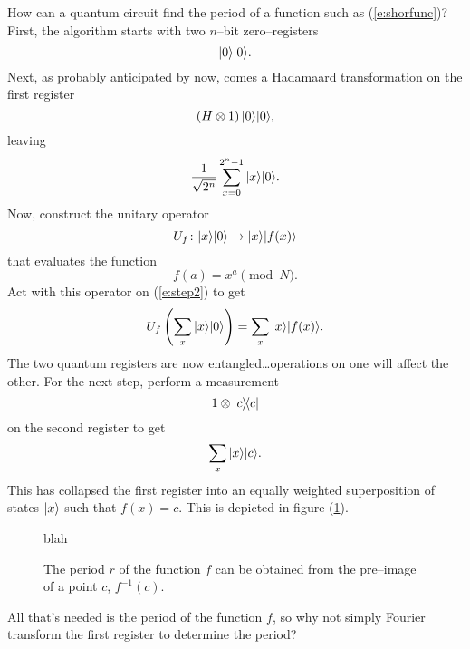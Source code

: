 How can a quantum circuit find the period of a function
such as (\ref{e:shorfunc})?  First, the algorithm starts
with two $n$--bit zero--registers
\begin{equation}
{|{0}\rangle}{|{0}\rangle}.
\end{equation}
Next, as probably anticipated by now, comes a Hadamaard
transformation on the first register 
\begin{equation}
\left( H\otimes 1 \right) {|{0}\rangle}{|{0}\rangle},
\end{equation}
leaving
\begin{equation}
\frac{1}{\sqrt{2^n}}\sum_{x=0}^{2^n-1} {|{x}\rangle}{|{0}\rangle}.
\label{e:step2}
\end{equation}
Now, construct the unitary operator
\begin{equation}
U_f\colon{|{x}\rangle}{|{0}\rangle}\to{|{x}\rangle}{|{f(x)}\rangle}
\end{equation}
that evaluates the function
\begin{equation}
f(a) = x^a\pmod{N}.
\end{equation}
Act with this operator on (\ref{e:step2}) to get
\begin{equation}
U_f \left( \sum_{x} {|{x}\rangle}{|{0}\rangle} \right)
= \sum_{x} {|{x}\rangle}{|{f(x)}\rangle}.
\end{equation}
The two quantum registers are now entangled\dots operations on
one will affect the other.  For the next step, 
perform a measurement 
\begin{equation}
1\otimes {|{c}\rangle\!\langle{c}|}
\end{equation}
on the second register to get
\begin{equation}
\sum_x {|{x}\rangle}{|{c}\rangle}.
\end{equation}
This has collapsed the first register into an equally weighted
superposition of states ${|{x}\rangle}$ such that 
$f(x) = c$.  
This is depicted in figure (\ref{fig:shor}).
\begin{figure}[h]
\begin{center}
blah
\caption{The period $r$ of the function $f$ can be obtained from
the pre--image of a point $c$, $f^{-1}(c)$.}
\label{fig:shor}
\end{center}
\end{figure}
All that's needed is the period of the function
$f$, so why not simply Fourier transform the first register
to determine the period?



